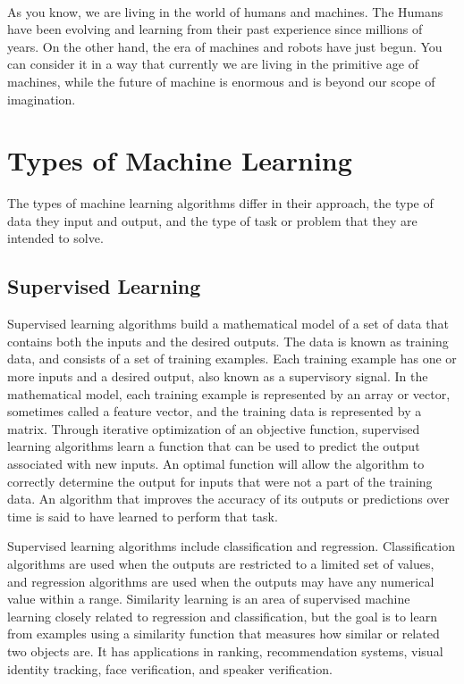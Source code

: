 \documentclass{report}
\begin{document}
\paragraph{}As you know, we are living in the world of humans and machines. The Humans have been evolving and learning from their past experience since millions of years. On the other hand, the era of machines and robots have just begun. You can consider it in a way that currently we are living in the primitive age of machines, while the future of machine is enormous and is beyond our scope of imagination.

\section{Types of Machine Learning}
The types of machine learning algorithms differ in their approach, the type of data they input and output, and the type of task or problem that they are intended to solve.


\subsection{Supervised Learning}
Supervised learning algorithms build a mathematical model of a set of data that contains both the inputs and the desired outputs. The data is known as training data, and consists of a set of training examples. Each training example has one or more inputs and a desired output, also known as a supervisory signal. In the mathematical model, each training example is represented by an array or vector, sometimes called a feature vector, and the training data is represented by a matrix. Through iterative optimization of an objective function, supervised learning algorithms learn a function that can be used to predict the output associated with new inputs. An optimal function will allow the algorithm to correctly determine the output for inputs that were not a part of the training data. An algorithm that improves the accuracy of its outputs or predictions over time is said to have learned to perform that task. 

Supervised learning algorithms include classification and regression. Classification algorithms are used when the outputs are restricted to a limited set of values, and regression algorithms are used when the outputs may have any numerical value within a range. Similarity learning is an area of supervised machine learning closely related to regression and classification, but the goal is to learn from examples using a similarity function that measures how similar or related two objects are. It has applications in ranking, recommendation systems, visual identity tracking, face verification, and speaker verification.
\end{document}
